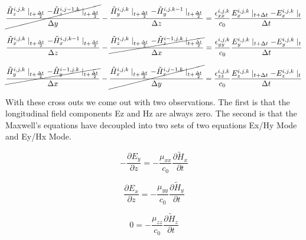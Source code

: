 \documentclass[a4paper,10pt]{article}
\begin{document}
\begin{equation*}
  \cancel{\frac{\tilde{H}_{z}^{i,j,k}\mid_{t+\frac{\Delta t}{2}} - \tilde{H}_{z}^{i,j-1,k}\mid_{t+\frac  {\Delta t}{2}}}{\Delta y}} - \frac{\tilde{H}_{y}^{i,j,k}\mid_{t+\frac  {\Delta t}{2}} - \tilde{H}_{y}^{i,j,k-1}\mid_{t+\frac  {\Delta t}{2}}}{\Delta z} = \frac{\epsilon_{xx}^{i,j,k}}{c_0} \frac{E_{x}^{i,j,k}\mid_{t+\Delta t} - E_{x}^{i,j,k}\mid_{t}}{\Delta t}\notag
\end{equation*}

\begin{equation*}
  \frac{\tilde{H}_{x}^{i,j,k}\mid_{t+\frac{\Delta t}{2}} - \tilde{H}_{x}^{i,j,k-1}\mid_{t+\frac  {\Delta t}{2}}}{\Delta z} - \cancel{\frac{\tilde{H}_{z}^{i,j,k}\mid_{t+\frac  {\Delta t}{2}} - \tilde{H}_{z}^{i-1,j,k}\mid_{t+\frac  {\Delta t}{2}}}{\Delta x}} = \frac{\epsilon_{yy}^{i,j,k}}{c_0} \frac{E_{y}^{i,j,k}\mid_{t+\Delta t} - E_{y}^{i,j,k}\mid_{t}}{\Delta t}\notag
\end{equation*}

\begin{equation*}
  \cancel{\frac{\tilde{H}_{y}^{i,j,k}\mid_{t+\frac{\Delta t}{2}} - \tilde{H}_{y}^{i-1,j,k}\mid_{t+\frac  {\Delta t}{2}}}{\Delta x}} - \cancel{\frac{\tilde{H}_{x}^{i,j,k}\mid_{t+\frac  {\Delta t}{2}} - \tilde{H}_{x}^{i,j-1,k}\mid_{t+\frac  {\Delta t}{2}}}{\Delta y}} = \frac{\epsilon_{zz}^{i,j,k}}{c_0} \frac{E_{z}^{i,j,k}\mid_{t+\Delta t} - E_{z}^{i,j,k}\mid_{t}}{\Delta t}\notag
\end{equation*}


With these cross outs we come out with two observations.  The first is that the longitudinal field components Ez and Hz are always zero.  The second is that the Maxwell's equations have decoupled into two sets of two equations Ex/Hy Mode and Ey/Hx Mode.

\begin{equation*}
  - \frac{\partial E_y}{\partial z} = -\frac{\mu_{xx}}{c_0}\frac{\partial\tilde{H}_x}{\partial t}
\end{equation*}

\begin{equation*}
  \frac{\partial E_x}{\partial z} = -\frac{\mu_{yy}}{c_0}\frac{\partial\tilde{H}_y}{\partial t}
\end{equation*}

\begin{equation*}
  0 = -\frac{\mu_{zz}}{c_0}\frac{\partial\tilde{H}_z}{\partial t}
\end{equation*}
\end{document}
